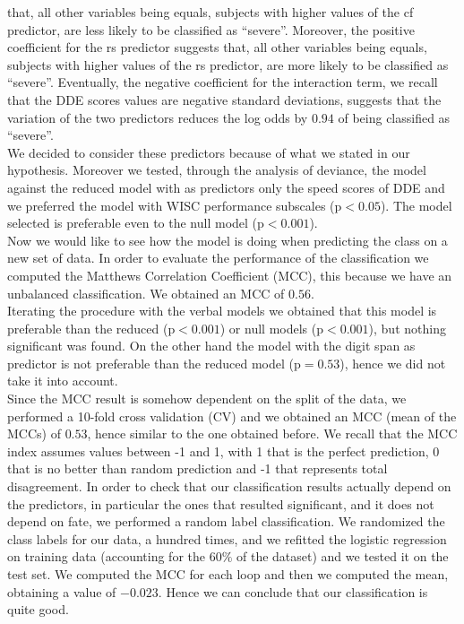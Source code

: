 \documentclass[11pt, a4paper, twoside, openright]{article}
\begin{document}
that, all other variables being equals, subjects with higher values of
the cf predictor, are less likely to be classified as
``severe''. Moreover, the positive coefficient for the rs predictor
suggests that, all other variables being equals, subjects with higher
values of the rs predictor, are more likely to be classified as
``severe''. Eventually, the negative coefficient for the interaction
term, we recall that the DDE scores values are negative standard
deviations, suggests that the variation of the two predictors reduces
the log odds by $0.94$ of being classified as
``severe''.\\
We decided to consider these predictors because of what we stated in
our hypothesis. Moreover we tested, through the analysis of deviance,
the model against the reduced model with as predictors only the speed
scores of DDE and we preferred the model with WISC performance
subscales (p$<0.05$). The model selected is preferable even to the
null model (p$<0.001$).\\
Now we would like to see how the model is doing when predicting the
class on a new set of data. In order to evaluate the performance of
the classification we computed the Matthews Correlation Coefficient
(MCC), this because we have an unbalanced classification. We obtained
an MCC of $0.56$.\\
Iterating the procedure with the verbal models we obtained that this
model is preferable than the reduced (p$<0.001$) or null models
(p$<0.001$), but nothing significant was found. On the other hand the
model with the digit span as predictor is not preferable than the
reduced model (p$=0.53$), hence we did not take it into account.\\
Since the MCC result is somehow dependent on the split of the data, we
performed a 10-fold cross validation (CV) and we obtained an MCC (mean
of the MCCs) of $0.53$, hence similar to the one obtained before. We
recall that the MCC index assumes values between -1 and 1, with 1 that
is the perfect prediction, 0 that is no better than random prediction
and -1 that represents total disagreement. In order to check that our
classification results actually depend on the predictors, in
particular the ones that resulted significant, and it does not depend
on fate, we performed a random label classification. We randomized the
class labels for our data, a hundred times, and we refitted the
logistic regression on training data (accounting for the
$60\%$ of the dataset) and we tested it on the test set. We computed
the MCC for each loop and then we computed the mean, obtaining a value
of $-0.023$. Hence we can conclude that our classification is quite
good.
\end{document}
